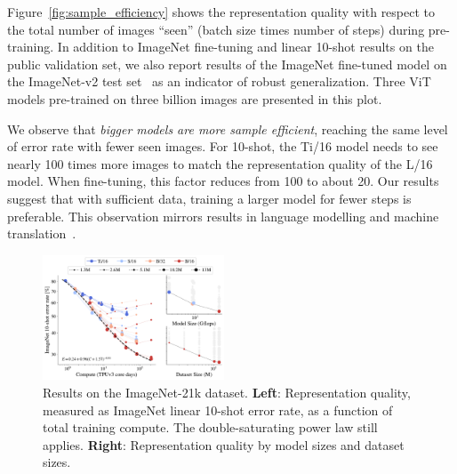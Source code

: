 Figure~\ref{fig:sample_efficiency} shows the representation quality with respect to the total number of images ``seen'' (batch size times number of steps) during pre-training. 
In addition to ImageNet fine-tuning and linear 10-shot results on the public validation set, we also report results of the ImageNet fine-tuned model on the ImageNet-v2 test set~\cite{recht2019imagenet} as an indicator of robust generalization.
Three ViT models pre-trained on three billion images are presented in this plot. 

We observe that \textit{bigger models are more sample efficient}, reaching the same level of error rate with fewer seen images.
For 10-shot, the Ti/16 model needs to see nearly 100 times more images to match the representation quality of the L/16 model.
When fine-tuning, this factor reduces from 100 to about 20.
Our results suggest that with sufficient data, training a larger model for fewer steps is preferable.
This observation mirrors results in language modelling and machine translation~\cite{kaplan2020scaling,gshard}.


\begin{figure}[b]
  \begin{center}
    \includegraphics[width=0.48\textwidth]{figs/scaling_laws_i21k.pdf}
  \end{center}
  \caption{Results on the ImageNet-21k dataset. \textbf{Left}: Representation quality, measured as ImageNet linear 10-shot error rate, as a function of total training compute. The double-saturating power law still applies. \textbf{Right}: Representation quality by model sizes and dataset sizes.}\label{fig:scaling_laws_i21k}
\end{figure}

